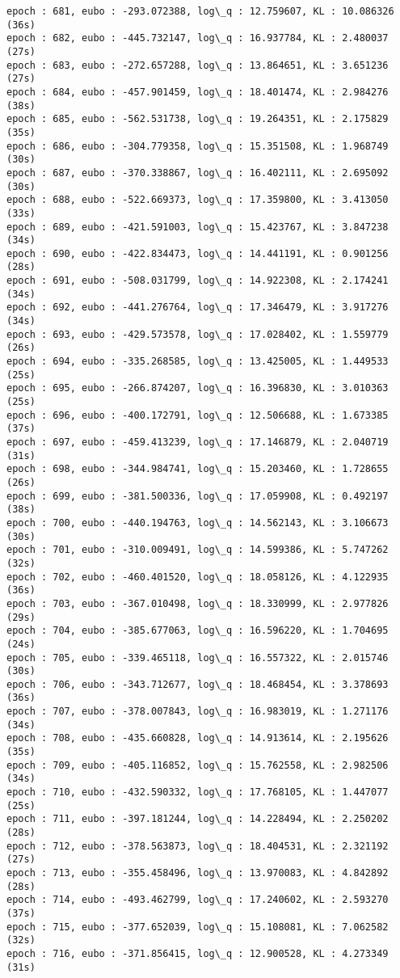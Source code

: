 \documentclass[11pt]{article}
\begin{document}
\begin{Verbatim}[commandchars=\\\{\}]
epoch : 681, eubo : -293.072388, log\_q : 12.759607, KL : 10.086326 (36s)
epoch : 682, eubo : -445.732147, log\_q : 16.937784, KL : 2.480037 (27s)
epoch : 683, eubo : -272.657288, log\_q : 13.864651, KL : 3.651236 (27s)
epoch : 684, eubo : -457.901459, log\_q : 18.401474, KL : 2.984276 (38s)
epoch : 685, eubo : -562.531738, log\_q : 19.264351, KL : 2.175829 (35s)
epoch : 686, eubo : -304.779358, log\_q : 15.351508, KL : 1.968749 (30s)
epoch : 687, eubo : -370.338867, log\_q : 16.402111, KL : 2.695092 (30s)
epoch : 688, eubo : -522.669373, log\_q : 17.359800, KL : 3.413050 (33s)
epoch : 689, eubo : -421.591003, log\_q : 15.423767, KL : 3.847238 (34s)
epoch : 690, eubo : -422.834473, log\_q : 14.441191, KL : 0.901256 (28s)
epoch : 691, eubo : -508.031799, log\_q : 14.922308, KL : 2.174241 (34s)
epoch : 692, eubo : -441.276764, log\_q : 17.346479, KL : 3.917276 (34s)
epoch : 693, eubo : -429.573578, log\_q : 17.028402, KL : 1.559779 (26s)
epoch : 694, eubo : -335.268585, log\_q : 13.425005, KL : 1.449533 (25s)
epoch : 695, eubo : -266.874207, log\_q : 16.396830, KL : 3.010363 (25s)
epoch : 696, eubo : -400.172791, log\_q : 12.506688, KL : 1.673385 (37s)
epoch : 697, eubo : -459.413239, log\_q : 17.146879, KL : 2.040719 (31s)
epoch : 698, eubo : -344.984741, log\_q : 15.203460, KL : 1.728655 (26s)
epoch : 699, eubo : -381.500336, log\_q : 17.059908, KL : 0.492197 (38s)
epoch : 700, eubo : -440.194763, log\_q : 14.562143, KL : 3.106673 (30s)
epoch : 701, eubo : -310.009491, log\_q : 14.599386, KL : 5.747262 (32s)
epoch : 702, eubo : -460.401520, log\_q : 18.058126, KL : 4.122935 (36s)
epoch : 703, eubo : -367.010498, log\_q : 18.330999, KL : 2.977826 (29s)
epoch : 704, eubo : -385.677063, log\_q : 16.596220, KL : 1.704695 (24s)
epoch : 705, eubo : -339.465118, log\_q : 16.557322, KL : 2.015746 (30s)
epoch : 706, eubo : -343.712677, log\_q : 18.468454, KL : 3.378693 (36s)
epoch : 707, eubo : -378.007843, log\_q : 16.983019, KL : 1.271176 (34s)
epoch : 708, eubo : -435.660828, log\_q : 14.913614, KL : 2.195626 (35s)
epoch : 709, eubo : -405.116852, log\_q : 15.762558, KL : 2.982506 (34s)
epoch : 710, eubo : -432.590332, log\_q : 17.768105, KL : 1.447077 (25s)
epoch : 711, eubo : -397.181244, log\_q : 14.228494, KL : 2.250202 (28s)
epoch : 712, eubo : -378.563873, log\_q : 18.404531, KL : 2.321192 (27s)
epoch : 713, eubo : -355.458496, log\_q : 13.970083, KL : 4.842892 (28s)
epoch : 714, eubo : -493.462799, log\_q : 17.240602, KL : 2.593270 (37s)
epoch : 715, eubo : -377.652039, log\_q : 15.108081, KL : 7.062582 (32s)
epoch : 716, eubo : -371.856415, log\_q : 12.900528, KL : 4.273349 (31s)

\end{Verbatim}
\end{document}
